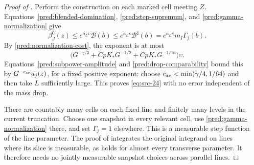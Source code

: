 \begin{proof}[Proof of ]
Perform the construction on each marked cell meeting \(Z\).
Equations~\eqref{pred:blended-domination},
\eqref{pred:step-supremum}, and \eqref{pred:gamma-normalization} give
\[
 \beta_J^0(z)\le e^{a_L\upsilon}\mathcal B(b)
       \le e^{a_L\upsilon}\mathcal B^\sharp(b)
       =e^{a_L\upsilon}m_I\Gamma_j(b).
\]
By \eqref{pred:normalization-cost}, the exponent is at most
\[
 \bigl(G^{-\gamma/3}+CpK_*G^{-1/2}
                    +CpK_*G^{-1/16}\bigr)\upsilon.
\]
Equations~\eqref{pred:subpower-amplitude} and
\eqref{pred:drop-comparability} bound this by
\(G^{-c_{\rm av}}u_j(z)\), for a fixed positive exponent:
choose \(c_{\rm av}<\min(\gamma/4,1/64)\) and then take \(L\)
sufficiently large. This proves \eqref{eq:src-24} with no error
independent of the mass drop.

There are countably many cells on each fixed line and finitely many
levels in the current truncation. Choose one snapshot in every
relevant cell, use \eqref{pred:gamma-normalization} there, and set
\(\Gamma_j=1\) elsewhere. This is a measurable step function of the
line parameter. The proof of  integrates the
original integrand on lines where its slice is measurable, as holds for
almost every transverse parameter. It therefore needs no jointly
measurable snapshot choices across parallel lines.
\end{proof}
